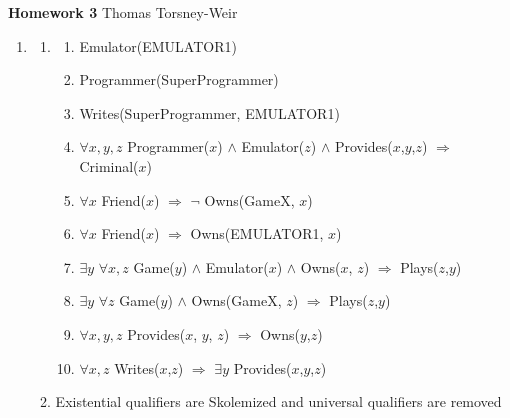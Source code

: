 \documentclass[10pt]{article}
\begin{document}
{\bf Homework 3} \hfill {\raggedleft Thomas Torsney-Weir}

\begin{enumerate}
\item %
  \begin{enumerate}
  \item %
    \begin{enumerate}
    \item Emulator(EMULATOR1)
    \item Programmer(SuperProgrammer)
    \item Writes(SuperProgrammer, EMULATOR1)
    \item $\forall x,y,z$ Programmer($x$) $\land$ Emulator($z$) $\land$ Provides($x$,$y$,$z$) $\Rightarrow$ Criminal($x$)
    \item $\forall x$ Friend($x$) $\Rightarrow$ $\neg$ Owns(GameX, $x$)
    \item $\forall x$ Friend($x$) $\Rightarrow$ Owns(EMULATOR1, $x$)
    \item $\exists y$ $\forall x, z$ Game($y$) $\land$ Emulator($x$) 
                          $\land$ Owns($x$, $z$) $\Rightarrow$ Plays($z$,$y$)
    \item $\exists y$ $\forall z$ Game($y$) $\land$ Owns(GameX, $z$) 
                          $\Rightarrow$ Plays($z$,$y$)
    \item $\forall x,y,z$ Provides($x$, $y$, $z$) $\Rightarrow$ Owns($y$,$z$)
    \item $\forall x,z$ Writes($x$,$z$) $\Rightarrow$ 
            $\exists y$ Provides($x$,$y$,$z$)
    \end{enumerate}
  \item %
    Existential qualifiers are Skolemized and universal qualifiers are removed


\end{enumerate}
\end{enumerate}
\end{document}
